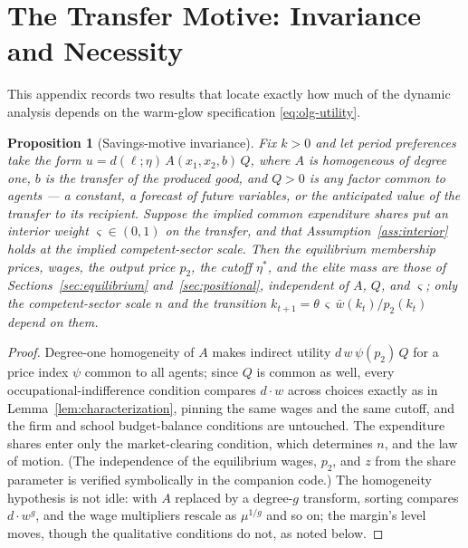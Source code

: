 \documentclass[12pt,letterpaper]{article}
\newtheorem{proposition}{Proposition}
\theoremstyle{definition}
\begin{document}
\section{The Transfer Motive: Invariance and Necessity}\label{app:motive}

This appendix records two results that locate exactly how much of the dynamic analysis depends on the warm-glow specification \eqref{eq:olg-utility}.

\begin{proposition}[Savings-motive invariance]\label{prop:invariance}
Fix $k>0$ and let period preferences take the form $u = d(\ell;\eta)\,A(x_1,x_2,b)\,Q$, where $A$ is homogeneous of degree one, $b$ is the transfer of the produced good, and $Q>0$ is any factor common to agents --- a constant, a forecast of future variables, or the anticipated value of the transfer to its recipient.
Suppose the implied common expenditure shares put an interior weight $\varsigma\in(0,1)$ on the transfer, and that Assumption~\ref{ass:interior} holds at the implied competent-sector scale.
Then the equilibrium membership prices, wages, the output price $p_2$, the cutoff $\eta^\ast$, and the elite mass are those of Sections~\ref{sec:equilibrium} and~\ref{sec:positional}, independent of $A$, $Q$, and $\varsigma$; only the competent-sector scale $n$ and the transition $k_{t+1}=\theta\,\varsigma\,\bar{w}(k_t)/p_2(k_t)$ depend on them.
\end{proposition}

\begin{proof}
Degree-one homogeneity of $A$ makes indirect utility $d\,w\,\psi(p_2)\,Q$ for a price index $\psi$ common to all agents; since $Q$ is common as well, every occupational-indifference condition compares $d\cdot w$ across choices exactly as in Lemma~\ref{lem:characterization}, pinning the same wages and the same cutoff, and the firm and school budget-balance conditions are untouched.
The expenditure shares enter only the market-clearing condition, which determines $n$, and the law of motion.
(The independence of the equilibrium wages, $p_2$, and $z$ from the share parameter is verified symbolically in the companion code.)
The homogeneity hypothesis is not idle: with $A$ replaced by a degree-$g$ transform, sorting compares $d\cdot w^{g}$, and the wage multipliers rescale as $\mu^{1/g}$ and so on; the margin's level moves, though the qualitative conditions do not, as noted below.
\end{proof}
\end{document}
